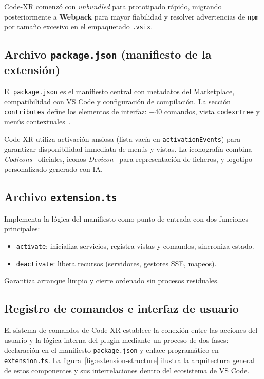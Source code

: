 \documentclass[a4paper, 12pt]{book}
\begin{document}
Code-XR comenzó con \emph{unbundled} para prototipado rápido, migrando posteriormente a \textbf{Webpack} para mayor fiabilidad y resolver advertencias de \texttt{npm} por tamaño excesivo en el empaquetado \texttt{.vsix}.

\subsection{Archivo \texttt{package.json} (manifiesto de la extensión)}
El \texttt{package.json} es el manifiesto central con metadatos del Marketplace, compatibilidad con VS Code y configuración de compilación. La sección \texttt{contributes} define los elementos de interfaz: +40 comandos, vista \texttt{codexrTree} y menús contextuales~\cite{vscode-bundling}.

Code-XR utiliza activación ansiosa (lista vacía en \texttt{activationEvents}) para garantizar disponibilidad inmediata de menús y vistas. La iconografía combina \emph{Codicons}~\cite{codicons} oficiales, iconos \emph{Devicon}~\cite{devicon} para representación de ficheros, y logotipo personalizado generado con IA.

\subsection{Archivo \texttt{extension.ts}}
Implementa la lógica del manifiesto como punto de entrada con dos funciones principales:
\begin{itemize}
  \item \texttt{activate}: inicializa servicios, registra vistas y comandos, sincroniza estado.
  \item \texttt{deactivate}: libera recursos (servidores, gestores SSE, mapeos).
\end{itemize}

Garantiza arranque limpio y cierre ordenado sin procesos residuales.

\subsection{Registro de comandos e interfaz de usuario}
El sistema de comandos de Code-XR establece la conexión entre las acciones del usuario y la lógica interna del plugin mediante un proceso de dos fases: declaración en el manifiesto \texttt{package.json} y enlace programático en \texttt{extension.ts}. La figura~\ref{fig:extension-structure} ilustra la arquitectura general de estos componentes y sus interrelaciones dentro del ecosistema de VS Code.
\end{document}
